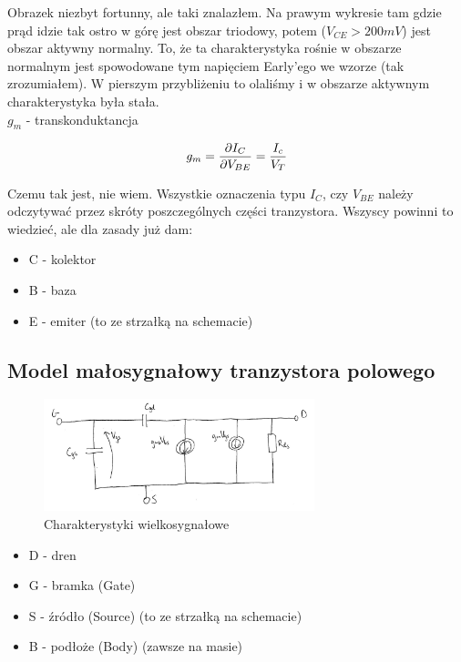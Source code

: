 \documentclass[10pt,a4paper]{article}
\begin{document}
Obrazek niezbyt fortunny, ale taki znalazłem. Na prawym wykresie tam gdzie prąd idzie tak ostro w górę jest obszar triodowy, potem ($V_{CE} > 200mV$) jest obszar aktywny normalny. To, że ta charakterystyka rośnie w obszarze normalnym jest spowodowane tym napięciem Early'ego we wzorze (tak zrozumiałem). W pierszym przybliżeniu to olaliśmy i w obszarze aktywnym charakterystyka była stała.\\


$g_m$ - transkonduktancja

\begin{equation}
g_m = {\partial I_C \over \partial V_{BE}} = {I_c \over V_T}
\end{equation}

Czemu tak jest, nie wiem. Wszystkie oznaczenia typu $I_C$, czy $V_{BE}$ należy odczytywać przez skróty poszczególnych części tranzystora. Wszyscy powinni to wiedzieć, ale dla zasady już dam:
\begin{itemize}
\item C - kolektor
\item B - baza
\item E - emiter (to ze strzałką na schemacie)
\end{itemize}



\subsection{Model małosygnałowy tranzystora polowego}
\begin{figure}[H]
\centering
\includegraphics[width=0.7\textwidth]{malosyg_mos.png}
\caption{Charakterystyki wielkosygnałowe}
\end{figure}

\begin{itemize}
\item D - dren
\item G - bramka (Gate)
\item S - źródło (Source) (to ze strzałką na schemacie)
\item B - podłoże (Body) (zawsze na masie)
\end{itemize}
\end{document}
